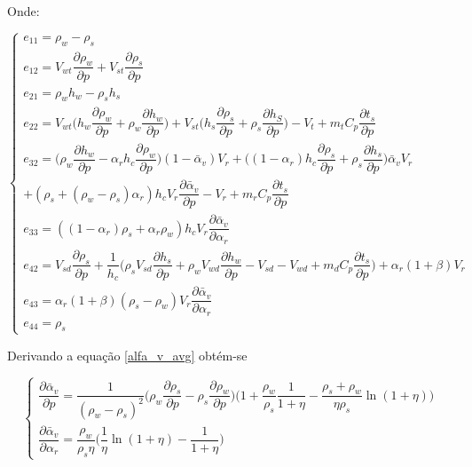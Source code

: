 Onde:

\begin{equation}
  \begin{cases}
    e_{11} = \rho_w - \rho_s \\
    e_{12} = V_{wt} \dfrac{\partial \rho_w}{\partial p} + V_{st}
    \dfrac{\partial \rho_s}{\partial p} \\
    e_{21} = \rho_w h_w - \rho_s h_s \\
    e_{22} = V_{wt} \biggl(h_w \dfrac{\partial \rho_w}{\partial p} +
    \rho_w \dfrac{\partial h_w}{\partial p}\biggr) + V_{st} \biggl(h_s
    \dfrac{\partial \rho_s}{\partial p} + \rho_s \dfrac{\partial
      h_S}{\partial p}\biggr) - V_t + m_t C_p \dfrac{\partial
      t_s}{\partial p} \\
    e_{32} = \biggl(\rho_w \dfrac{\partial h_w}{\partial p} - \alpha_r
    h_c \dfrac{\partial \rho_w}{\partial p} \biggr) (1 - \bar{\alpha}_v)
    V_r + \biggl( (1-\alpha_r) h_c \dfrac{\partial \rho_s}{\partial p} 
    + \rho_s \dfrac{\partial h_s}{\partial p} \biggr) \bar{\alpha}_v V_r \\
    +  (\rho_s + (\rho_w - \rho_s)\alpha_r) h_c V_r \dfrac{\partial 
      \bar{\alpha}_v}{\partial p} - V_r + m_r C_p \dfrac{\partial
    t_s}{\partial p} \\
    e_{33} = ((1 - \alpha_r)\rho_s + \alpha_r \rho_w) h_c V_r
    \dfrac{\partial \bar{\alpha}_v}{\partial \alpha_r}\\
    e_{42} = V_{sd} \dfrac{\partial \rho_s}{\partial p} + \dfrac{1}{h_c}
    \biggl(\rho_s V_{sd} \dfrac{\partial h_s}{\partial p} + \rho_w
    V_{wd} \dfrac{\partial h_w}{\partial p} - V_{sd} - V_{wd} + m_d C_p
    \dfrac{\partial t_s}{\partial p}\biggr) + \alpha_r (1 + \beta) V_r\\
    e_{43} = \alpha_r (1 + \beta)(\rho_s - \rho_w)V_r \dfrac{\partial \bar{\alpha}_v}{\partial \alpha_r}\\
    e_{44} = \rho_s
  \end{cases}
  \label{eij_vals}
\end{equation}

Derivando a equação \ref{alfa_v_avg} obtém-se

\begin{equation}
  \begin{cases}
    \dfrac{\partial \bar{\alpha}_v}{\partial p} = \dfrac{1}{(\rho_w -
      \rho_s)^2} \biggl(\rho_w \dfrac{\partial \rho_s}{\partial p} -
    \rho_s\dfrac{\partial \rho_w}{\partial p} \biggr) \biggl(1 +
    \dfrac{\rho_w}{\rho_s} \dfrac{1}{1+\eta} - \dfrac{\rho_s +
      \rho_w}{\eta \rho_s} \ln(1+\eta)\biggr) \\
    \dfrac{\partial \bar{\alpha}_v}{\partial \alpha_r} =
    \dfrac{\rho_w}{\rho_s \eta} \biggl(\dfrac{1}{\eta} \ln(1+\eta) -
    \dfrac{1}{1 + \eta}\biggr)
  \end{cases}
  \label{derivs_alfa_v_avg}
\end{equation}

